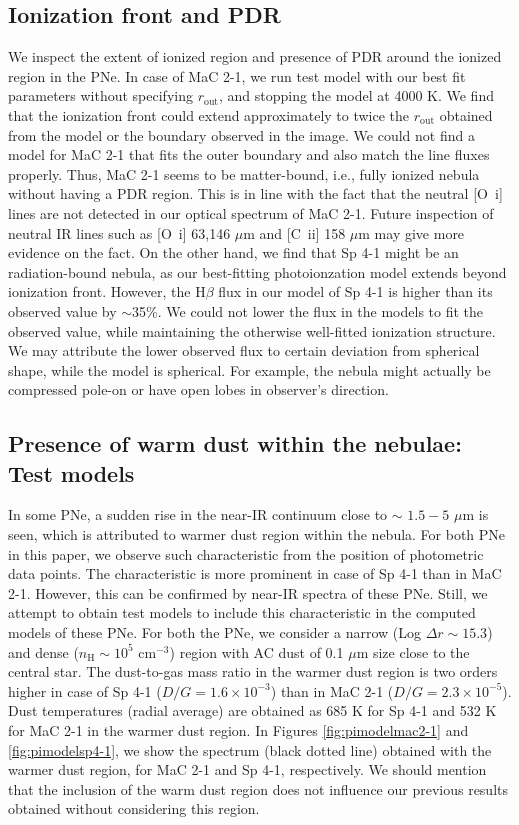 \documentclass[a4paper,fleqn,usenatbib]{mnras}
\begin{document}
\subsection{Ionization front and PDR} \label{sec:ionizationfront&PDR}
We inspect the extent of ionized region and presence of PDR around the ionized region in the PNe. In case of MaC 2-1, we run test model with our best fit parameters without specifying $r_\mathrm{out}$, and stopping the model at 4000 K. We find that the ionization front could extend approximately to twice the $r_\mathrm{out}$ obtained from the model or the boundary observed in the image. We could not find a model for MaC 2-1 that fits the outer boundary and also match the line fluxes properly. Thus, MaC 2-1 seems to be matter-bound, i.e., fully ionized nebula without having a PDR region. This is in line with the fact that the neutral [O~{\sc i}] lines are not detected in our optical spectrum of MaC 2-1. Future inspection of neutral IR lines such as [O~{\sc i}] 63,146 $\mu$m and [C~{\sc ii}] 158 $\mu$m may give more evidence on the fact. On the other hand, we find that Sp 4-1 might be an radiation-bound nebula, as our best-fitting photoionzation model extends beyond ionization front. However, the H$\beta$ flux in our model of Sp 4-1 is higher than its observed value by $\sim$35$\%$. We could not lower the flux in the models to fit the observed value, while maintaining the otherwise well-fitted ionization structure. We may attribute the lower observed flux to certain deviation from spherical shape, while the model is spherical. For example, the nebula might actually be compressed pole-on or have open lobes in observer's direction.  

\subsection{Presence of warm dust within the nebulae: Test models} \label{sec:testmodels}
In some PNe, a sudden rise in the near-IR continuum close to $\sim$ $1.5-5$ $\mu$m is seen, which is attributed to warmer dust region within the nebula. For both PNe in this paper, we observe such characteristic from the position of photometric data points. The characteristic is more prominent in case of Sp 4-1 than in MaC 2-1. However, this can be confirmed by near-IR spectra of these PNe. Still, we attempt to obtain test models to include this characteristic in the computed models of these PNe. For both the PNe, we consider a narrow (Log ${\Delta}r\sim15.3$) and dense ($n_\mathrm{H}\sim10^5$ $\mathrm{cm^{-3}}$) region with AC dust of 0.1 $\mu$m size close to the central star. The dust-to-gas mass ratio in the warmer dust region is two orders higher in case of Sp 4-1 ($D/G=1.6\times10^{-3}$) than in MaC 2-1 ($D/G=2.3\times10^{-5}$). Dust temperatures (radial average) are obtained as 685 K for Sp 4-1 and 532 K for MaC 2-1 in the warmer dust region. In Figures \ref{fig:pimodelmac2-1} and \ref{fig:pimodelsp4-1}, we show the spectrum (black dotted line) obtained with the warmer dust region, for MaC 2-1 and Sp 4-1, respectively. We should mention that the inclusion of the warm dust region does not influence our previous results obtained without considering this region. 
\end{document}

